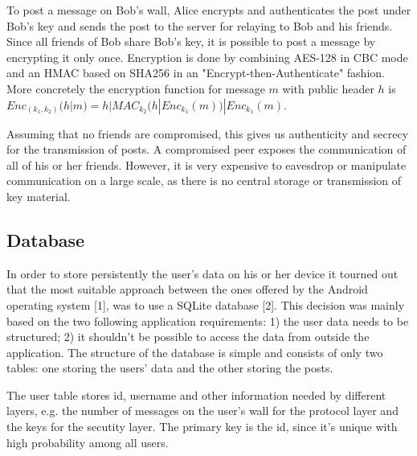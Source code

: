 \documentclass{report}
\begin{document}
To post a message on Bob's wall, Alice encrypts and authenticates the post under Bob's key and sends the post to the server for relaying to Bob and his friends. Since all friends of Bob share Bob's key, it is possible to post a message by encrypting it only once. Encryption is done by combining AES-128 in CBC mode and an HMAC based on SHA256 in an "Encrypt-then-Authenticate" fashion. More concretely the encryption function for message $m$ with public header $h$ is \newline
$Enc_{(k_1, k_2)}(h|m) = h | MAC_{k_2}(h | Enc_{k_1}(m)) | Enc_{k_1}(m)$.

\newline
Assuming that no friends are compromised, this gives us authenticity and secrecy for the transmission of posts. A compromised peer exposes the communication of all of his or her friends. However, it is very expensive to eavesdrop or manipulate communication on a large scale, as there is no central storage or transmission of key material.

\subsection{Database}
In order to store persistently the user's data on his or her device it tourned out that the most suitable approach between the ones offered by the Android operating system [1], was to use a SQLite database [2]. This decision was mainly based on the two following application requirements:
1) the user data needs to be structured;
2) it shouldn't be possible to access the data from outside the application.
The structure of the database is simple and consists of only two tables: one storing the users' data and the other storing the posts.

The user table stores id, username and other information needed by different layers, e.g. the number of messages on the user's wall for the protocol layer and the keys for the secutity layer. The primary key is the id, since it's unique with high probability among all users.
\end{document}
